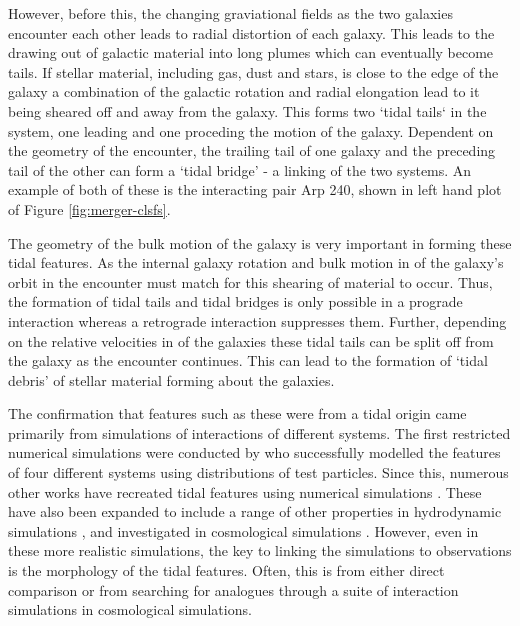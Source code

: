 However, before this, the changing graviational fields as the two galaxies encounter each other leads to radial distortion of each galaxy. This leads to the drawing out of galactic material into long plumes which can eventually become tails. If stellar material, including gas, dust and stars, is close to the edge of the galaxy a combination of the galactic rotation and radial elongation lead to it being sheared off and away from the galaxy. This forms two `tidal tails` in the system, one leading and one proceding the motion of the galaxy. Dependent on the geometry of the encounter, the trailing tail of one galaxy and the preceding tail of the other can form a `tidal bridge' - a linking of the two systems. An example of both of these is the interacting pair Arp 240, shown in left hand plot of Figure \ref{fig:merger-clsfs}. 

The geometry of the bulk motion of the galaxy is very important in forming these tidal features. As the internal galaxy rotation and bulk motion in of the galaxy's orbit in the encounter must match for this shearing of material to occur. Thus, the formation of tidal tails and tidal bridges is only possible in a prograde interaction whereas a retrograde interaction suppresses them. Further, depending on the relative velocities in of the galaxies these tidal tails can be split off from the galaxy as the encounter continues. This can lead to the formation of `tidal debris' of stellar material forming about the galaxies.

The confirmation that features such as these were from a tidal origin came primarily from simulations of interactions of different systems. The first restricted numerical simulations were conducted by \citet{1972ApJ...178..623T} who successfully modelled the features of four different systems using distributions of test particles. Since this, numerous other works have recreated tidal features using numerical simulations \citep{1993ApJ...410..586S, 2008AN....329.1046P, 2009AJ....137.3071B, 2016A&C....16...26W}. These have also been expanded to include a range of other properties in hydrodynamic simulations \citep{2021MNRAS.503.3113M}, and investigated in cosmological simulations \citep{2020MNRAS.493.3716H}. However, even in these more realistic simulations, the key to linking the simulations to observations is the morphology of the tidal features. Often, this is from either direct comparison or from searching for analogues through a suite of interaction simulations in cosmological simulations.

